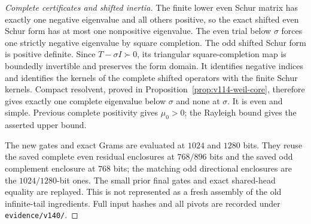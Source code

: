 \documentclass[11pt]{article}
\theoremstyle{remark}
\begin{document}
\begin{proof}[Complete certificates and shifted inertia]
The finite lower even Schur matrix has exactly one negative eigenvalue
and all others positive, so the exact shifted even Schur form has
at most one nonpositive eigenvalue. The even trial below $\sigma$
forces one strictly negative eigenvalue by square completion.
The odd shifted Schur form is positive definite.
Since $T-\sigma I\succ0$, its triangular square-completion map is
boundedly invertible and preserves the form domain. It identifies
negative indices and identifies the kernels of the complete shifted
operators with the finite Schur kernels. Compact resolvent, proved
in Proposition~\ref{prop:v114-weil-core}, therefore gives exactly one
complete eigenvalue below $\sigma$ and none at $\sigma$. It is even
and simple. Previous complete positivity gives $\mu_0>0$; the
Rayleigh bound gives the asserted upper bound.

The new gates and exact Grams are evaluated at $1024$ and $1280$
bits. They reuse the saved complete even residual enclosures at
$768/896$ bits and the saved odd complement enclosure at $768$ bits;
the matching odd directional enclosures are the $1024/1280$-bit
ones. The small prior final gates and exact shared-head equality
are replayed. This is not represented as a fresh assembly of the
old infinite-tail ingredients. Full input hashes and all pivots are
recorded under \texttt{evidence/v140/}.
\end{proof}
\end{document}
